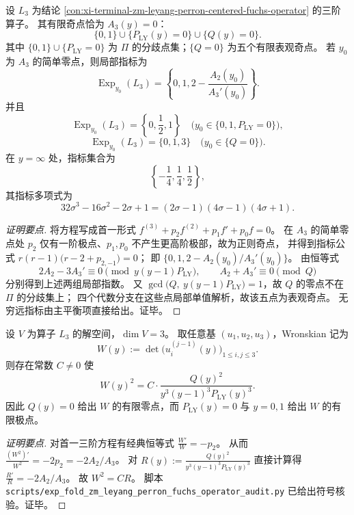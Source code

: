 \begin{conclusion}\label{con:xi-terminal-zm-leyang-perron-fuchs-riemann-apparent-split}
设 \(L_3\) 为结论 \ref{con:xi-terminal-zm-leyang-perron-centered-fuchs-operator} 的三阶算子。
其有限奇点恰为 \(A_3(y)=0\)：
\[
\{0,1\}\cup\{P_{\mathrm{LY}}(y)=0\}\cup\{Q(y)=0\}.
\]
其中 \(\{0,1\}\cup\{P_{\mathrm{LY}}=0\}\) 为 \(\Pi\) 的分歧点集；\(\{Q=0\}\) 为五个有限表观奇点。
若 \(y_0\) 为 \(A_3\) 的简单零点，则局部指标为
\[
\operatorname{Exp}_{y_0}(L_3)=\left\{0,1,2-\frac{A_2(y_0)}{A_3'(y_0)}\right\}.
\]
并且
\[
\operatorname{Exp}_{y_0}(L_3)=\left\{0,\frac12,1\right\}
\quad\bigl(y_0\in\{0,1,P_{\mathrm{LY}}=0\}\bigr),
\]
\[
\operatorname{Exp}_{y_0}(L_3)=\{0,1,3\}
\quad\bigl(y_0\in\{Q=0\}\bigr).
\]
在 \(y=\infty\) 处，指标集合为
\[
\left\{-\frac14,\frac14,\frac12\right\},
\]
其指标多项式为
\[
32\sigma^{3}-16\sigma^{2}-2\sigma+1=(2\sigma-1)(4\sigma-1)(4\sigma+1).
\]
\end{conclusion}
\begin{proof}[证明要点]
将方程写成首一形式 \(f^{(3)}+p_2f^{(2)}+p_1f'+p_0f=0\)。
在 \(A_3\) 的简单零点处 \(p_2\) 仅有一阶极点、\(p_1,p_0\) 不产生更高阶极部，故为正则奇点，
并得到指标公式
\(
r(r-1)\bigl(r-2+p_{2,-1}\bigr)=0
\)；
即
\(
\{0,1,2-A_2(y_0)/A_3'(y_0)\}
\)。
由恒等式
\[
2A_2-3A_3'\equiv 0\pmod{y(y-1)P_{\mathrm{LY}}},\qquad
A_2+A_3'\equiv 0\pmod{Q}
\]
分别得到上述两组局部指数。
又 \(\gcd\!\bigl(Q,\ y(y-1)P_{\mathrm{LY}}\bigr)=1\)，故 \(Q\) 的零点不在 \(\Pi\) 的分歧集上；
四个代数分支在这些点局部单值解析，故该五点为表观奇点。
无穷远指标由主平衡项直接给出。证毕。
\end{proof}

\begin{conclusion}\label{con:xi-terminal-zm-leyang-perron-fuchs-wronskian-square}
设 \(V\) 为算子 \(L_3\) 的解空间，\(\dim V=3\)。
取任意基 \((u_1,u_2,u_3)\)，Wronskian 记为
\[
W(y):=\det\bigl(u_i^{(j-1)}(y)\bigr)_{1\le i,j\le 3}.
\]
则存在常数 \(C\neq 0\) 使
\[
W(y)^2
=
C\cdot\frac{Q(y)^2}{y^3(y-1)^3P_{\mathrm{LY}}(y)^3}.
\]
因此 \(Q(y)=0\) 给出 \(W\) 的有限零点，而 \(P_{\mathrm{LY}}(y)=0\) 与 \(y=0,1\) 给出 \(W\) 的有限极点。
\end{conclusion}
\begin{proof}[证明要点]
对首一三阶方程有经典恒等式
\(
\frac{W'}{W}=-p_2
\)。
从而
\(
\frac{(W^2)'}{W^2}=-2p_2=-2A_2/A_3
\)。
对
\(
R(y):=\frac{Q(y)^2}{y^3(y-1)^3P_{\mathrm{LY}}(y)^3}
\)
直接计算得
\(
\frac{R'}{R}=-2A_2/A_3
\)。
故 \(W^2=CR\)。
脚本 \texttt{scripts/exp\_fold\_zm\_leyang\_perron\_fuchs\_operator\_audit.py} 已给出符号核验。证毕。
\end{proof}

